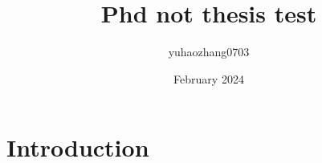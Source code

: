 \documentclass{article}
\title{Phd not thesis test}
\author{yuhaozhang0703 }
\date{February 2024}
\begin{document}
\maketitle

\section{Introduction}
\end{document}
